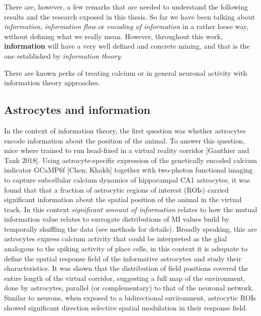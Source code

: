 There are, however, a few remarks that are needed to understand the following results and the research exposed in this thesis.
So far we have been talking about \textit{information}, \textit{information flow} or \textit{encoding of information} in a rather loose way, without defining what we really mean. 
However, throughout this work, \textbf{information} will have a very well defined and concrete mining, and that is the one established by \textit{information theory}.

There are known perks of treating calcium or in general neuronal activity with information theory approaches.
\subsection{Astrocytes and information}
\label{chap1:sec:3:subsec1:astro_info}
In the context of information theory, the first question was whether astrocytes encode information about the position of the animal.
To answer this question, mice where trained to run head-fixed in a virtual reality corridor [Gauthier and Tank 2018].
Using astrocyte-specific expression of the genetically encoded calcium indicator GCaMP6f [Chen; Khakh] together with two-photon functional imaging to capture subcellular calcium dynamics of hippocampal CA1 astrocytes, it was found that that a fraction of astrocytic regions of interest (ROIs) carried significant information about the spatial position of the animal in the virtual track.
In this context \textit{significant amount of information} relates to how the mutual information value relates to surrogate distributions of MI values build by temporally shuffling the data (see methods for details). 
Broadly speaking, this are astrocytes express calcium activity that could be interpreted as the glial analogous to the spiking activity of place cells, in this context it is adequate to define the spatial response field of the informative astrocytes and study their characteristics.
It was shown that the distribution of field positions covered the entire length of the virtual corridor, suggesting a full map of the environment, done by astrocytes, parallel (or complementary) to that of the neuronal network.
Similar to neurons, when exposed to a bidirectional environment, astrocytic ROIs showed significant direction selective spatial modulation in their response field.

